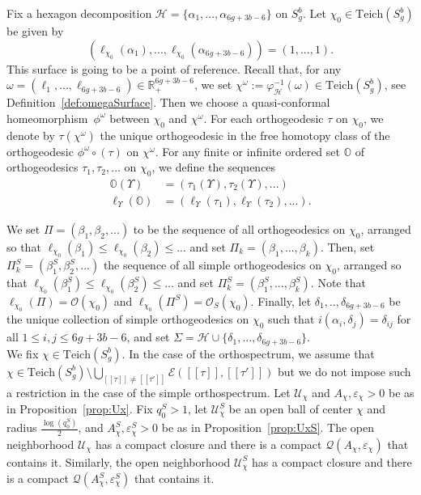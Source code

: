 \documentclass[a4paper,12pt]{article}
\theoremstyle{definition}
\theoremstyle{remark}
\begin{document}
Fix a hexagon decomposition $\mathcal{H}=\{\alpha_1,...,\alpha_{6g+3b-6} \}$ on $S_g^b$. Let $\chi_0 \in \mathrm{Teich}(S_g^b)$ be given by 
\[
    (\ell_{\chi_0}(\alpha_1),...,\ell_{\chi_0}(\alpha_{6g+3b-6}))=(1,...,1).
\]
This surface is going to be a point of reference. Recall that, for any \mbox{$\omega=(\ell_1,...,\ell_{6g+3b-6})\in \mathbb{R}_+^{6g+3b-6}$}, we set $\chi^{\omega}:=\varphi_{\mathcal{H}}^{-1}(\omega) \in \mathrm{Teich}(S_g^b)$, see Definition~\ref{def:omegaSurface}. Then we choose a quasi-conformal homeomorphism~$\phi^{\omega}$ between $\chi_0$ and $\chi^{\omega}$. For each orthogeodesic $\tau$ on $\chi_0$, we denote by $\tau(\chi^{\omega})$ the unique orthogeodesic in the free homotopy class of the orthogeodesic $\phi^{\omega} \circ (\tau) $ on $\chi^{\omega} $. For any finite or infinite ordered set $\mathbb{O}$ of orthogeodesics $\tau_1, \tau_2, ...$ on $\chi_0$, we define the sequences
\begin{align*}
    \mathbb{O}(\Upsilon) & =(\tau_1(\Upsilon), \tau_2(\Upsilon),...) \\
    \ell_{\Upsilon}(\mathbb{O}) & =(\ell_{\Upsilon}(\tau_1), \ell_{\Upsilon}(\tau_2), ... ).
\end{align*}

We set $\Pi= (\beta_1, \beta_2, ...)$ to be the sequence of all orthogeodesics on $\chi_0$, arranged so that $\ell_{\chi_0}(\beta_1) \leqslant \ell_{\chi_0}(\beta_2) \leqslant ...$ and set $\Pi_k = (\beta_1,...,\beta_k)$. Then, set $\Pi_k^S= (\beta_1^S, \beta_2^S, ...)$ the sequence of all simple orthogeodesics on $\chi_0$, arranged so that $\ell_{\chi_0}(\beta_1^S) \leqslant \ell_{\chi_0}(\beta_2^S) \leqslant ...$ and set $\Pi_k^S=(\beta_1^S,...,\beta_k^S)$. Note that $\ell_{\chi_0}(\Pi)=\mathcal{O}(\chi_0)$ and $\ell_{\chi_0}(\Pi^S)=\mathcal{O}_{S}(\chi_0)$. Finally, let $\delta_1,..,\delta_{6g+3b-6}$ be the unique collection of simple orthogeodesics on $\chi_0$ such that $i(\alpha_i,\delta_j)=\delta_{ij}$ for all $1 \leqslant i,j \leqslant 6g+3b-6$, and set $\Sigma = \mathcal{H} \cup \{ \delta_1,...,\delta_{6g+3b-6} \}$.\\



We fix $\chi \in \mathrm{Teich}(S_g^b)$. In the case of the orthospectrum, we assume that $\chi \in \mathrm{Teich}(S_g^b) \setminus \bigcup_{[[\tau]]\neq [[\tau']]} \mathcal{E}([[\tau]],[[\tau']])$ but we do not impose such a restriction in the case of the simple orthospectrum. Let $\mathcal{U}_\chi$ and $A_\chi,\varepsilon_\chi>0$ be as in Proposition~\ref{prop:Ux}. Fix $q_0^S >1$, let $\mathcal{U}_\chi^S$ be an open ball of center $\chi$ and radius $\frac{\log(q_0^S)}{2}$, and $A_\chi^S,\varepsilon_\chi^S>0$ be as in Proposition~\ref{prop:UxS}. The open neighborhood $\mathcal{U}_\chi$ has a compact closure and there is a compact $\mathcal{Q}(A_\chi,\varepsilon_\chi)$ that contains it. Similarly, the open neighborhood $\mathcal{U}_\chi^S$ has a compact closure and there is a compact $\mathcal{Q}(A_\chi^S,\varepsilon_\chi^S)$ that contains it.\\
\end{document}
